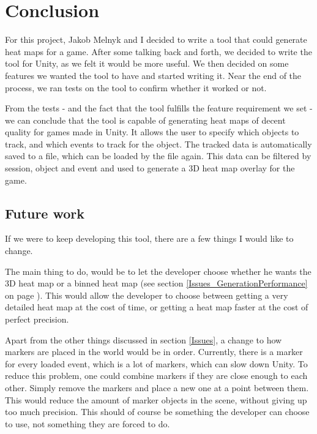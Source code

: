 \section{Conclusion}
\label{Conclusion}

For this project, Jakob Melnyk and I decided to write a tool that could generate heat maps for a game. After some talking back and forth, we decided to write the tool for Unity, as we felt it would be more useful. We then decided on some features we wanted the tool to have and started writing it. Near the end of the process, we ran tests on the tool to confirm whether it worked or not.

From the tests - and the fact that the tool fulfills the feature requirement we set - we can conclude that the tool is capable of generating heat maps of decent quality for games made in Unity. It allows the user to specify which objects to track, and which events to track for the object. The tracked data is automatically saved to a file, which can be loaded by the file again. This data can be filtered by session, object and event and used to generate a 3D heat map overlay for the game.

\subsection{Future work}
\label{Conclusion_Future}

If we were to keep developing this tool, there are a few things I would like to change.

The main thing to do, would be to let the developer choose whether he wants the 3D heat map or a binned heat map (see section \ref{Issues_GenerationPerformance} on page \pageref{Issues_GenerationPerformance}). This would allow the developer to choose between getting a very detailed heat map at the cost of time, or getting a heat map faster at the cost of perfect precision.

Apart from the other things discussed in section \ref{Issues}, a change to how markers are placed in the world would be in order. Currently, there is a marker for every loaded event, which is a lot of markers, which can slow down Unity. To reduce this problem, one could combine markers if they are close enough to each other. Simply remove the markers and place a new one at a point between them. This would reduce the amount of marker objects in the scene, without giving up too much precision. This should of course be something the developer can choose to use, not something they are forced to do.